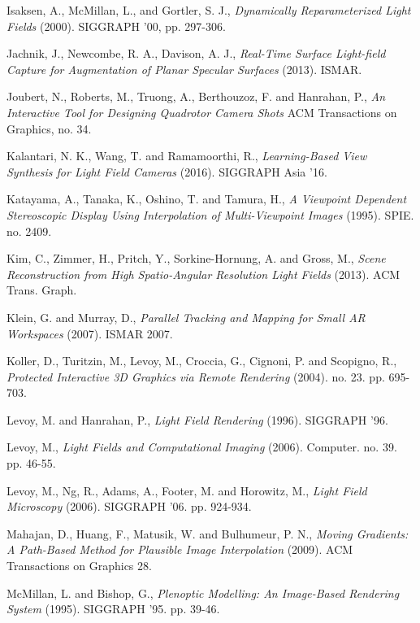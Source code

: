 \documentclass[12pt]{report}
\begin{document}
\begin{thebibliography}{10}
	Isaksen, A., McMillan, L., and Gortler, S. J., \emph{Dynamically Reparameterized Light Fields} (2000). SIGGRAPH '00, pp. 297-306.

	Jachnik, J., Newcombe, R. A., Davison, A. J., \emph{Real-Time Surface Light-field Capture for Augmentation of Planar Specular Surfaces} (2013). ISMAR.
	
	Joubert, N., Roberts, M., Truong, A., Berthouzoz, F. and Hanrahan, P., \emph{An Interactive Tool for Designing Quadrotor Camera Shots} ACM Transactions on Graphics, no. 34. 

	Kalantari, N. K., Wang, T. and Ramamoorthi, R., \emph{Learning-Based View Synthesis for Light Field Cameras} (2016). SIGGRAPH Asia '16.

	Katayama, A., Tanaka, K., Oshino, T. and Tamura, H., \emph{A Viewpoint Dependent Stereoscopic Display Using Interpolation of Multi-Viewpoint Images} (1995). SPIE. no. 2409.
	
	Kim, C., Zimmer, H., Pritch, Y., Sorkine-Hornung, A. and Gross, M., \emph{Scene Reconstruction from High Spatio-Angular Resolution Light Fields} (2013). ACM Trans. Graph.	
	
	Klein, G. and Murray, D., \emph{Parallel Tracking and Mapping for Small AR Workspaces} (2007). ISMAR 2007. 	

	Koller, D., Turitzin, M., Levoy, M., Croccia, G., Cignoni, P. and Scopigno, R., \emph{Protected Interactive 3D Graphics via Remote Rendering} (2004). no. 23. pp. 695-703.

	Levoy, M. and Hanrahan, P., \emph{Light Field Rendering} (1996). SIGGRAPH '96.
	
	Levoy, M., \emph{Light Fields and Computational Imaging} (2006). Computer. no. 39. pp. 46-55.

	Levoy, M., Ng, R., Adams, A., Footer, M. and Horowitz, M., \emph{Light Field Microscopy} (2006). SIGGRAPH '06. pp. 924-934.
	
	Mahajan, D., Huang, F., Matusik, W. and Bulhumeur, P. N., \emph{Moving Gradients: A Path-Based Method for Plausible Image Interpolation} (2009). ACM Transactions on Graphics 28.	
	
	McMillan, L. and Bishop, G., \emph{Plenoptic Modelling: An Image-Based Rendering System} (1995). SIGGRAPH '95. pp. 39-46.


\end{thebibliography}
\end{document}
